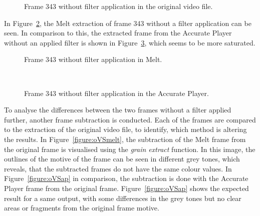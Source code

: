 \documentclass[../MasterThesis.tex]{subfiles}
\begin{document}
\begin{figure}[H]
	\begin{center}
		\caption[Frame 343 without filter application in the original video file.]{Frame 343 without filter application in the original video file.}
		\label{figure:nofilterO}
	\end{center}
\end{figure}


In Figure~\ref{figure:nofilterMelt}, the Melt extraction of frame 343 without a filter application can be seen. In comparison to this, the extracted frame from the Accurate Player without an applied filter is shown in Figure~\ref{figure:nofilterAP}, which seems to be more saturated.


\begin{minipage}{0.48\textwidth}
	\begin{figure}[H]
		\begin{center}
			\caption[Frame 343 without filter application in Melt.]{Frame 343 without filter application in Melt.}
			\label{figure:nofilterMelt}
		\end{center}
	\end{figure}
\end{minipage}\begin{minipage}{0.04\textwidth}
	\ 
\end{minipage}\begin{minipage}{0.48\textwidth}
	\begin{figure}[H]
		\begin{center}
			\caption[Frame 343 without filter application in the Accurate Player.]{Frame 343 without filter application in the Accurate Player.}
			\label{figure:nofilterAP}
		\end{center}
	\end{figure}
\end{minipage}

\vspace*{1.5em}
To analyse the differences between the two frames without a filter applied further, another frame subtraction is conducted. Each of the frames are compared to the extraction of the original video file, to identify, which method is altering the results.
In Figure~\ref{figure:oVSmelt}, the subtraction of the Melt frame from the original frame is visualised using the \textit{grain extract} function. In this image, the outlines of the motive of the frame can be seen in different grey tones, which reveals, that the subtracted frames do not have the same colour values.
In Figure~\ref{figure:oVSap} in comparison, the subtraction is done with the Accurate Player frame from the original frame. Figure~\ref{figure:oVSap} shows the expected result for a same output, with some differences in the grey tones but no clear areas or fragments from the original frame motive.
\end{document}
